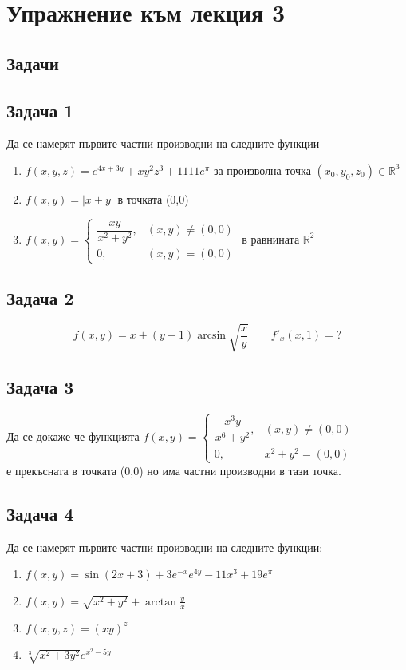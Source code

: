 \documentclass[a4paper,fleqn,12pt]{article}
\theoremstyle{definition}
\begin{document}
\newpage
\section{Упражнение към лекция 3}
\subsection{Задачи}

\subsection*{Задача 1}
Да се намерят първите частни производни на следните функции
\begin{enumerate}

\item $f(x,y,z) = e^{4x+3y} + xy^2z^3 + 1111e^\pi$ за произволна точка $(x_0, y_0, z_0) \in \mathbb{R}^3$
\item $f(x,y) = \vert x + y \vert$ в точката (0,0)
\item $
f(x,y) = 
\begin{cases}
\dfrac{xy}{x^2 + y^2}, & (x,y) \neq (0,0)  \\
0, & (x,y) = (0,0) 
\end{cases}$ в равнината $\mathbb{R}^2$ 
\end{enumerate}

\subsection*{Задача 2}
$$f(x,y) = x + (y-1)\arcsin{\sqrt{\dfrac{x}{y}}}\qquad f'_x(x,1) = ?$$

\subsection*{Задача 3}
Да се докаже че функцията $f(x,y) = 
\begin{cases}
\dfrac{x^3y}{x^6 + y^2}, & (x,y) \neq (0,0)  \\
0, & x^2 + y^2 = (0,0) 
\end{cases}
$ \\
е прекъсната в точката (0,0) но има частни производни в тази точка. 

\subsection*{Задача 4}
Да се намерят първите частни производни на следните функции:
\begin{enumerate}
\item $f(x,y) = \sin{(2x+3)} + 3e^{-x}e^{4y} - 11x^3 + 19e^\pi$
\item $f(x,y) = \sqrt{x^2 + y^2} + \arctan {\frac{y}{x}}$
\item $f(x,y,z) = (xy)^z$
\item $\sqrt[3]{x^2+3y^2} e^{x^2 - 5y}$
\end{enumerate}
\end{document}
